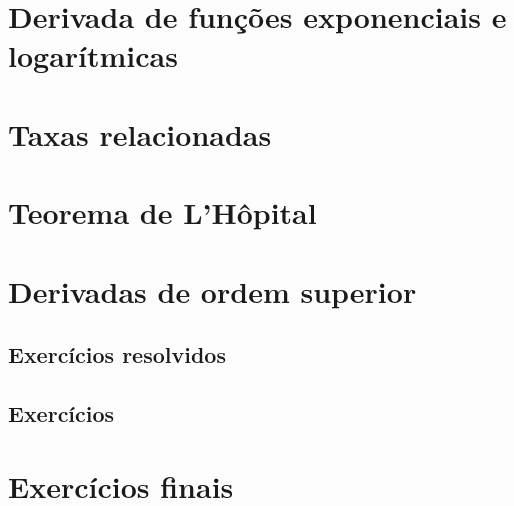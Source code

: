 \section{Derivada de funções exponenciais e logarítmicas}
\section{Taxas relacionadas}
\section{Teorema de L'Hôpital}
\section{Derivadas de ordem superior}


\construirSec



\subsection*{Exercícios resolvidos}

\construirExeresol

\subsection*{Exercícios}

\construirExer

\section{Exercícios finais}

\construirExer

